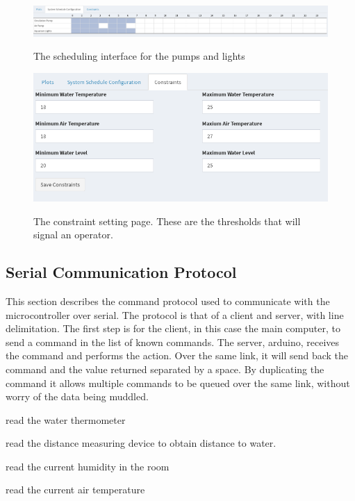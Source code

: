 \documentclass[american,12pt]{article}
\begin{document}
\begin{figure}[h]
	\includegraphics[width=\linewidth]{imgs/sched}
	\label{fig:schedular}
	\caption{The scheduling interface for the pumps and lights}
\end{figure}

\begin{figure}[h]
	\includegraphics[width=\linewidth]{imgs/constraints}
	\label{fig:constraints}
	\caption{The constraint setting page. These are the thresholds that will 
		signal an operator.}
\end{figure}

\subsection{Serial Communication Protocol}
This section describes the command protocol used to communicate with the
microcontroller over serial. The protocol is that of a client and server,
with line delimitation. The first step is for the client, in this case the
main computer, to send a command in the list of known commands. The server,
arduino, receives the command and performs the action. Over the same link, it
will send back the command and the value returned separated by a space. By
duplicating the command it allows multiple commands to be queued over the same
link, without worry of the data being muddled.

\begin{description}[style=nextline]
    \item[rWatThm] read the water thermometer
    \item[rdWaLvl] read the distance measuring device to obtain distance to water.
    \item[rdHumid] read the current humidity in the room
    \item[rdAirTm] read the current air temperature
\end{description}
\end{document}
